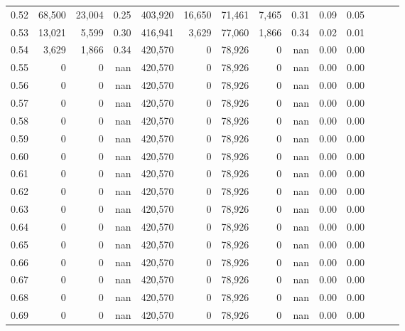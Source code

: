 \begin{tabular}{rrrrrrrrrrrrrr}
0.52 &  68,500 &  23,004 &  0.25 &  403,920 &   16,650 &  71,461 &   7,465 &  0.31 &  0.09 &      0.05 \\
0.53 &  13,021 &   5,599 &  0.30 &  416,941 &    3,629 &  77,060 &   1,866 &  0.34 &  0.02 &      0.01 \\
0.54 &   3,629 &   1,866 &  0.34 &  420,570 &        0 &  78,926 &       0 &   nan &  0.00 &      0.00 \\
0.55 &       0 &       0 &   nan &  420,570 &        0 &  78,926 &       0 &   nan &  0.00 &      0.00 \\
0.56 &       0 &       0 &   nan &  420,570 &        0 &  78,926 &       0 &   nan &  0.00 &      0.00 \\
0.57 &       0 &       0 &   nan &  420,570 &        0 &  78,926 &       0 &   nan &  0.00 &      0.00 \\
0.58 &       0 &       0 &   nan &  420,570 &        0 &  78,926 &       0 &   nan &  0.00 &      0.00 \\
0.59 &       0 &       0 &   nan &  420,570 &        0 &  78,926 &       0 &   nan &  0.00 &      0.00 \\
0.60 &       0 &       0 &   nan &  420,570 &        0 &  78,926 &       0 &   nan &  0.00 &      0.00 \\
0.61 &       0 &       0 &   nan &  420,570 &        0 &  78,926 &       0 &   nan &  0.00 &      0.00 \\
0.62 &       0 &       0 &   nan &  420,570 &        0 &  78,926 &       0 &   nan &  0.00 &      0.00 \\
0.63 &       0 &       0 &   nan &  420,570 &        0 &  78,926 &       0 &   nan &  0.00 &      0.00 \\
0.64 &       0 &       0 &   nan &  420,570 &        0 &  78,926 &       0 &   nan &  0.00 &      0.00 \\
0.65 &       0 &       0 &   nan &  420,570 &        0 &  78,926 &       0 &   nan &  0.00 &      0.00 \\
0.66 &       0 &       0 &   nan &  420,570 &        0 &  78,926 &       0 &   nan &  0.00 &      0.00 \\
0.67 &       0 &       0 &   nan &  420,570 &        0 &  78,926 &       0 &   nan &  0.00 &      0.00 \\
0.68 &       0 &       0 &   nan &  420,570 &        0 &  78,926 &       0 &   nan &  0.00 &      0.00 \\
0.69 &       0 &       0 &   nan &  420,570 &        0 &  78,926 &       0 &   nan &  0.00 &      0.00 \\

\end{tabular}
